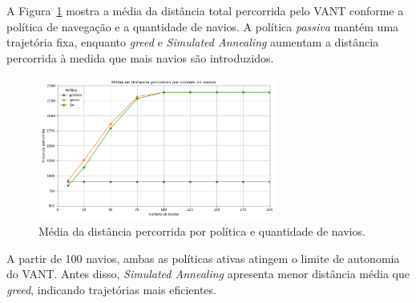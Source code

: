 A Figura~\ref{fig:distancia} mostra a média da distância total percorrida pelo VANT conforme a política de navegação e a quantidade de navios. A política \textit{passiva} mantém uma trajetória fixa, enquanto \textit{greed} e \textit{Simulated Annealing} aumentam a distância percorrida à medida que mais navios são introduzidos.

\begin{figure}[H]
    \centering
    \includegraphics[width=0.7\textwidth]{fig/resultado_dis.png}
    \caption{Média da distância percorrida por política e quantidade de navios.}
    \label{fig:distancia}
\end{figure}

A partir de 100 navios, ambas as políticas ativas atingem o limite de autonomia do VANT. Antes disso, \textit{Simulated Annealing} apresenta menor distância média que \textit{greed}, indicando trajetórias mais eficientes.






